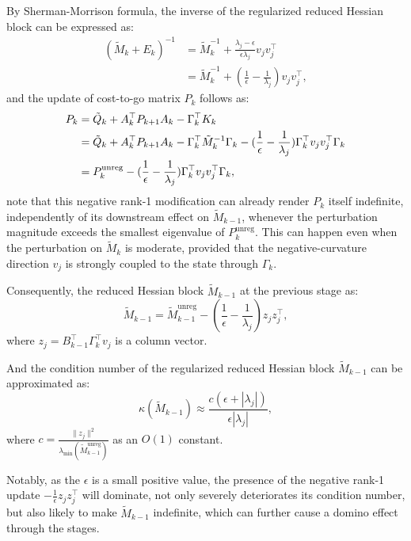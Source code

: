 \documentclass[class=scrbook, crop=false]{standalone}
\begin{document}
By Sherman-Morrison formula, the inverse of the regularized reduced Hessian block can be expressed as:
\begin{align*}
    (\tilde{M}_k + E_k)^{-1} &= \tilde{M}_k^{-1} + \frac{\lambda_j-\epsilon}{\epsilon \lambda_j} v_j v_j^\top \\
                            &= \tilde{M}_k^{-1} + (\frac{1}{\epsilon} - \frac{1}{\lambda_j}) v_j v_j^\top,
\end{align*}
and the update of cost-to-go matrix $P_k$ follows as:
\begin{align}
    P_k &= \tilde{Q}_k + A_k^\top P_{k+1} A_k - \Gamma_k^\top K_k \notag \\
        &=\tilde{Q}_k + A_k^\top P_{k+1} A_k - \Gamma_k^\top \tilde{M}_k^{-1} \Gamma_k - (\frac{1}{\epsilon} - \frac{1}{\lambda_j}) \Gamma_k^\top v_j v_j^\top \Gamma_k \notag \\
        &= P_k^{\mathrm{unreg}} - (\frac{1}{\epsilon} - \frac{1}{\lambda_j}) \Gamma_k^\top v_j v_j^\top \Gamma_k,
\end{align}
note that this negative rank-1 modification can already render $P_k$ itself indefinite, 
independently of its downstream effect on $\tilde{M}_{k-1}$, 
whenever the perturbation magnitude exceeds the smallest eigenvalue of $P_k^{\mathrm{unreg}}$. 
This can happen even when the perturbation on $\tilde{M}_k$ is moderate,
provided that the negative-curvature direction $v_j$ is strongly coupled to the state through $\Gamma_k$.

Consequently, the reduced Hessian block $\tilde{M}_{k-1}$ at the previous stage as:
\begin{equation}
    \tilde{M}_{k-1} = \tilde{M}_{k-1}^{\mathrm{unreg}} - (\frac{1}{\epsilon} - \frac{1}{\lambda_j}) z_j z_j^\top,
\end{equation}
where $z_j = B_{k-1}^\top \Gamma_k^\top v_j$ is a column vector.

And the condition number of the regularized reduced Hessian block $\tilde{M}_{k-1}$ can be approximated as:
\begin{equation}
    \kappa(\tilde{M}_{k-1}) \approx \frac{c (\epsilon + |\lambda_j|)}{\epsilon |\lambda_j|},
\end{equation}
where $c = \frac{\|z_j\|^2}{\lambda_{\min}(\tilde{M}_{k-1}^{\mathrm{unreg}})}$ as an $O(1)$ constant.

Notably, as the $\epsilon$ is a small positive value,
the presence of the negative rank-1 update $-\frac{1}{\epsilon} z_j z_j^\top$ will dominate, not only severely deteriorates its condition number,
but also likely to make $\tilde{M}_{k-1}$ indefinite, which can further cause a domino effect through the stages.
\end{document}

